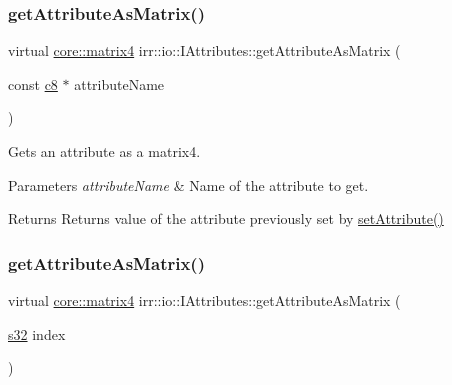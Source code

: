 \subsubsection{\texorpdfstring{get\+Attribute\+As\+Matrix()}{getAttributeAsMatrix()}\hspace{0.1cm}{\footnotesize\ttfamily [2/4]}}
{\footnotesize\ttfamily virtual \hyperlink{namespaceirr_1_1core_a4c9d4e29899535971052810954a14431}{core\+::matrix4} irr\+::io\+::\+I\+Attributes\+::get\+Attribute\+As\+Matrix (\begin{DoxyParamCaption}\item[{const \hyperlink{namespaceirr_a9395eaea339bcb546b319e9c96bf7410}{c8} $\ast$}]{attribute\+Name }\end{DoxyParamCaption})\hspace{0.3cm}{\ttfamily [pure virtual]}}



Gets an attribute as a matrix4. 


\begin{DoxyParams}{Parameters}
{\em attribute\+Name} & Name of the attribute to get. \\
\hline
\end{DoxyParams}
\begin{DoxyReturn}{Returns}
Returns value of the attribute previously set by \hyperlink{classirr_1_1io_1_1IAttributes_a03fa31acb481ae23678676cc183f09a6}{set\+Attribute()} 
\end{DoxyReturn}
\mbox{\label{classirr_1_1io_1_1IAttributes_aaceb2fc0fca684d941918ce18d876336}} 
\subsubsection{\texorpdfstring{get\+Attribute\+As\+Matrix()}{getAttributeAsMatrix()}\hspace{0.1cm}{\footnotesize\ttfamily [3/4]}}
{\footnotesize\ttfamily virtual \hyperlink{namespaceirr_1_1core_a4c9d4e29899535971052810954a14431}{core\+::matrix4} irr\+::io\+::\+I\+Attributes\+::get\+Attribute\+As\+Matrix (\begin{DoxyParamCaption}\item[{\hyperlink{namespaceirr_ac66849b7a6ed16e30ebede579f9b47c6}{s32}}]{index }\end{DoxyParamCaption})\hspace{0.3cm}{\ttfamily [pure virtual]}}



